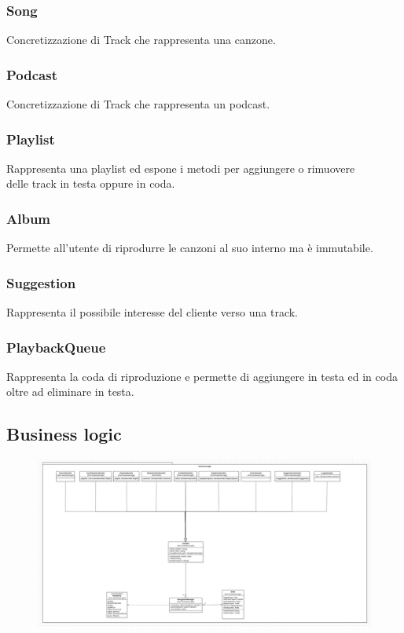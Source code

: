 \documentclass{article}
\begin{document}
  \subsubsection{Song}
  Concretizzazione di Track che rappresenta una canzone.

  \subsubsection{Podcast}
  Concretizzazione di Track che rappresenta un podcast.

  \subsubsection{Playlist}
  Rappresenta una playlist ed espone i metodi per aggiungere o rimuovere\\ delle track in testa oppure in coda.

  \subsubsection{Album}
  Permette all'utente di riprodurre le canzoni al suo interno ma è immutabile.

  \subsubsection{Suggestion}
  Rappresenta il possibile interesse del cliente verso una track.

  \subsubsection{PlaybackQueue}
  Rappresenta la coda di riproduzione e permette di aggiungere in testa ed in coda oltre ad eliminare in testa.

  \subsection{Business logic}

  \begin{figure}[H]
    \includegraphics[scale=0.28]{logic01}
  \end{figure}
\end{document}
